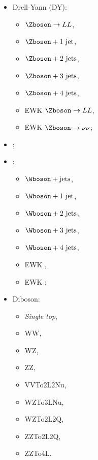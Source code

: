\begin{minipage}[t]{.3\textwidth}
\begin{itemize}
\item Drell-Yann (DY):
\begin{itemize}
\item $\Zboson \to LL$,
\item $\Zboson+\text{1 jet}$,
\item $\Zboson+\text{2 jets}$,
\item $\Zboson+\text{3 jets}$,
\item $\Zboson+\text{4 jets}$,
\item EWK $\Zboson\to LL$,
\item EWK $\Zboson\to \nu\nu$;
\end{itemize}
\item \ttbar;
\end{itemize}
\end{minipage}
\hfill
\begin{minipage}[t]{.3\textwidth}
\begin{itemize}
\item \Wjets:
\begin{itemize}
\item $\Wboson+\text{jets}$,
\item $\Wboson+\text{1 jet}$,
\item $\Wboson+\text{2 jets}$,
\item $\Wboson+\text{3 jets}$,
\item $\Wboson+\text{4 jets}$,
\item EWK \Wbosonminus,
\item EWK \Wbosonplus;
\end{itemize}
\end{itemize}
\end{minipage}
\hfill
\begin{minipage}[t]{.3\textwidth}
\begin{itemize}
\item Diboson:
\begin{itemize}
\item \emph{Single top},
\item WW,
\item WZ,
\item ZZ,
\item VVTo2L2Nu,
\item WZTo3LNu,
\item WZTo2L2Q,
\item ZZTo2L2Q,
\item ZZTo4L.
\end{itemize}
\end{itemize}
\end{minipage}

